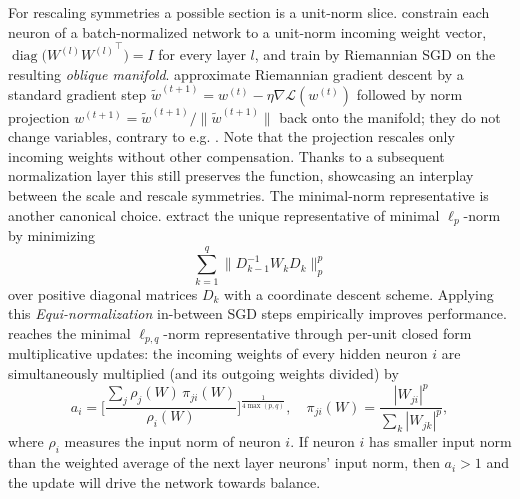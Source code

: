 \documentclass[mathematics,review,submit,moreauthors]{Definitions/mdpi}
\begin{document}
For rescaling symmetries a possible section is a unit-norm slice.
\citet{badrinarayanan2015} constrain each neuron of a batch-normalized network to a unit-norm incoming weight vector, $\operatorname{diag}\big(W^{(l)}{W^{(l)}}^{\top}\big)=I$ for every layer $l$, and train by Riemannian SGD on the resulting \emph{oblique manifold}.
\citet{huang2017} approximate Riemannian gradient descent by a standard gradient step $\tilde{w}^{(t+1)}=w^{(t)}-\eta\nabla\mathcal{L}(w^{(t)})$ followed by norm projection $w^{(t+1)}=\tilde{w}^{(t+1)}/\lVert\tilde{w}^{(t+1)}\rVert$ back onto the manifold; they do not change variables, contrary to e.g. \citep{salimans2016anips}.
Note that the projection rescales only incoming weights without other compensation. Thanks to a subsequent normalization layer this still preserves the function, showcasing an interplay between the scale and rescale symmetries.
The minimal-norm representative is another canonical choice.
\citet{stock2018} extract the unique representative of minimal $\ell_p$-norm by minimizing
\begin{equation*}
    \sum_{k=1}^{q}\big\lVert D_{k-1}^{-1}W_{k}D_{k}\big\rVert_p^p
\end{equation*}
over positive diagonal matrices $D_k$ with a coordinate descent scheme.
Applying this \emph{Equi-normalization} in-between SGD steps empirically improves performance.
\citet{saul2023} reaches the minimal $\ell_{p,q}$-norm representative through per-unit closed form multiplicative updates: the incoming weights of every hidden neuron $i$ are simultaneously multiplied (and its outgoing weights divided) by
\begin{equation*}
    a_i=\Bigg[\frac{\sum_{j}\rho_j(W)\,\pi_{ji}(W)}{\rho_i(W)}\Bigg]^{\frac{1}{4\max(p,q)}} ,
    \quad
    \pi_{ji}(W)=\frac{|W_{ji}|^p}{\sum_{k}|W_{jk}|^p},
\end{equation*}
where $\rho_i$ measures the input norm of neuron $i$.
If neuron $i$ has smaller input norm than the weighted average of the next layer neurons' input norm, then $a_i>1$ and the update will drive the network towards balance.
\end{document}

